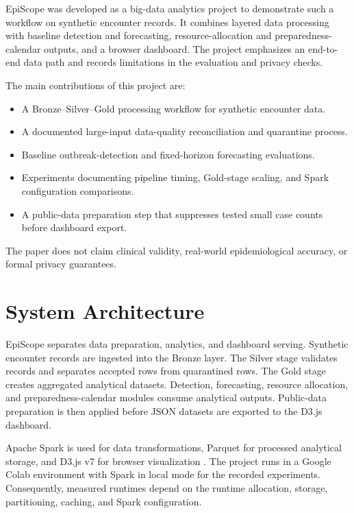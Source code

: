 \documentclass[conference]{IEEEtran}
\begin{document}
EpiScope was developed as a big-data analytics project to demonstrate such a workflow on synthetic encounter records. It combines layered data processing with baseline detection and forecasting, resource-allocation and preparedness-calendar outputs, and a browser dashboard. The project emphasizes an end-to-end data path and records limitations in the evaluation and privacy checks.

The main contributions of this project are:
\begin{itemize}
    \item A Bronze--Silver--Gold processing workflow for synthetic encounter data.
    \item A documented large-input data-quality reconciliation and quarantine process.
    \item Baseline outbreak-detection and fixed-horizon forecasting evaluations.
    \item Experiments documenting pipeline timing, Gold-stage scaling, and Spark configuration comparisons.
    \item A public-data preparation step that suppresses tested small case counts before dashboard export.
\end{itemize}

The paper does not claim clinical validity, real-world epidemiological accuracy, or formal privacy guarantees.

\section{System Architecture}

EpiScope separates data preparation, analytics, and dashboard serving. Synthetic encounter records are ingested into the Bronze layer. The Silver stage validates records and separates accepted rows from quarantined rows. The Gold stage creates aggregated analytical datasets. Detection, forecasting, resource allocation, and preparedness-calendar modules consume analytical outputs. Public-data preparation is then applied before JSON datasets are exported to the D3.js dashboard.

Apache Spark is used for data transformations, Parquet for processed analytical storage, and D3.js v7 for browser visualization \cite{spark,parquet,d3}. The project runs in a Google Colab environment with Spark in local mode for the recorded experiments. Consequently, measured runtimes depend on the runtime allocation, storage, partitioning, caching, and Spark configuration.
\end{document}
